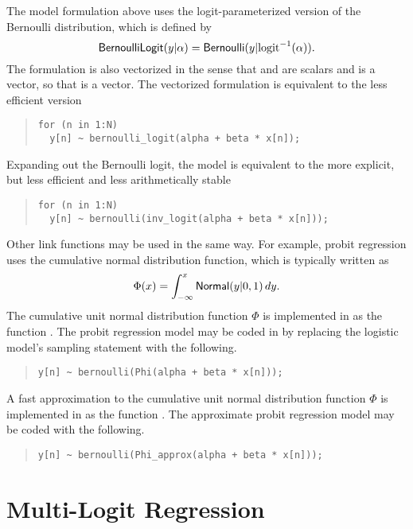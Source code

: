 The model formulation above uses the logit-parameterized version of
the Bernoulli distribution, which is defined by 
%
\[
\mbox{\sf BernoulliLogit}(y|\alpha) 
=
\mbox{\sf Bernoulli}(y | \mbox{logit}^{-1}(\alpha)).
\]
%
The formulation is also vectorized in the sense that  and
 are scalars and  is a vector, so that  is a vector.  The vectorized formulation is equivalent
to the less efficient version
%
\begin{quote}
\begin{Verbatim}
for (n in 1:N)
  y[n] ~ bernoulli_logit(alpha + beta * x[n]);
\end{Verbatim}
\end{quote}
%
Expanding out the Bernoulli logit, the model is equivalent to the more
explicit, but less efficient and less arithmetically stable
%
\begin{quote}
\begin{Verbatim}
for (n in 1:N)
  y[n] ~ bernoulli(inv_logit(alpha + beta * x[n]));
\end{Verbatim}
\end{quote}

Other link functions may be used in the same way.  For example, probit
regression uses the cumulative normal distribution function, which is
typically written as 
\[
\Phi(x) = \int_{-\infty}^x \mbox{\sf Normal}(y|0,1) \, dy.
\]
%
The cumulative unit normal distribution function $\Phi$ is implemented
in \Stan as the function .  The probit regression model
may be coded in \Stan by replacing the logistic model's sampling
statement with the following.
%
\begin{quote}
\begin{Verbatim}[fontsize=\small]
        y[n] ~ bernoulli(Phi(alpha + beta * x[n]));
\end{Verbatim}
\end{quote}
%
A fast approximation to the cumulative unit normal distribution function 
$\Phi$ is implemented in \Stan as the function .  The 
approximate probit regression model may be coded with the following.
%
\begin{quote}
\begin{Verbatim}[fontsize=\small]
        y[n] ~ bernoulli(Phi_approx(alpha + beta * x[n]));
\end{Verbatim}
\end{quote}

\section{Multi-Logit Regression}

